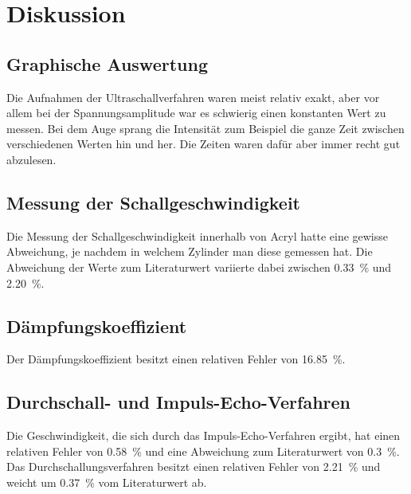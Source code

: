 \section{Diskussion}
\label{sec:Diskussion}

\subsection{Graphische Auswertung}
Die Aufnahmen der Ultraschallverfahren waren meist relativ exakt, aber vor allem bei der Spannungsamplitude war es schwierig einen 
konstanten Wert zu messen. Bei dem Auge sprang die Intensität zum Beispiel die ganze Zeit zwischen verschiedenen Werten hin und her. 
Die Zeiten waren dafür aber immer recht gut abzulesen.

\subsection{Messung der Schallgeschwindigkeit}
Die Messung der Schallgeschwindigkeit innerhalb von Acryl hatte eine gewisse Abweichung, je nachdem in welchem Zylinder man diese gemessen hat. 
Die Abweichung der Werte zum Literaturwert variierte dabei zwischen \SI{0.33}{\percent} und \SI{2.20}{\percent}. 

\subsection{Dämpfungskoeffizient}
Der Dämpfungskoeffizient besitzt einen relativen Fehler von \SI{16.85}{\percent}. 

\subsection{Durchschall- und Impuls-Echo-Verfahren} 
Die Geschwindigkeit, die sich durch das Impuls-Echo-Verfahren ergibt, hat einen relativen Fehler von \SI{0.58}{\percent} und eine Abweichung 
zum Literaturwert von \SI{0.3}{\percent}. Das Durchschallungsverfahren besitzt einen relativen Fehler von \SI{2.21}{\percent} und weicht um 
\SI{0.37}{\percent} vom Literaturwert ab.

